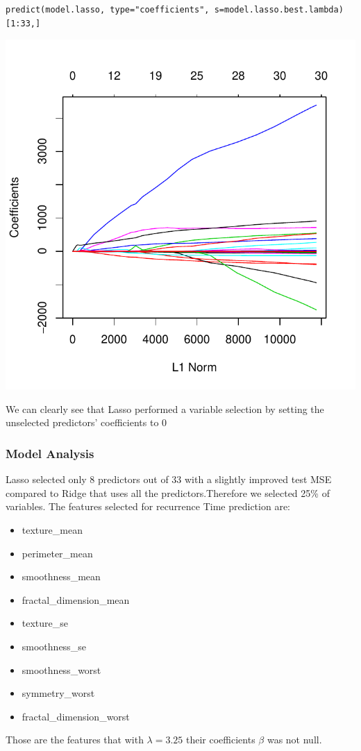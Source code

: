 \documentclass[]{report}
\begin{document}
\begin{lstlisting}
predict(model.lasso, type="coefficients", s=model.lasso.best.lambda)[1:33,]
\end{lstlisting}

\begin{center}
	\includegraphics[width=0.8\linewidth]{Figures/lasso_coeff}
\end{center}
We can clearly see that Lasso performed a variable selection by setting the unselected predictors' coefficients to 0

\subsubsection{Model Analysis}
 Lasso selected only 8 predictors out of 33 with a slightly improved test MSE compared to Ridge that uses all the predictors.Therefore we selected 25\% of variables. The features selected for recurrence Time prediction are:
 \begin{itemize} 
 \item texture\_mean
 \item perimeter\_mean
 \item smoothness\_mean
 \item fractal\_dimension\_mean
 \item texture\_se
 \item smoothness\_se
 \item smoothness\_worst
 \item symmetry\_worst
 \item fractal\_dimension\_worst
\end{itemize}
Those are the features that with $\lambda = 3.25 $ their coefficients $\beta$ was not null.
\end{document}
